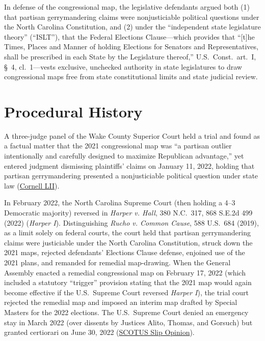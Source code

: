 \documentclass[12pt]{article}
\begin{document}
In defense of the congressional map, the legislative defendants argued both (1) that partisan gerrymandering claims were nonjusticiable political questions under the North Carolina Constitution, and (2) under the ``independent state legislature theory'' (``ISLT''), that the Federal Elections Clause---which provides that ``[t]he Times, Places and Manner of holding Elections for Senators and Representatives, shall be prescribed in each State by the Legislature thereof,'' U.S.\ Const.\ art.\ I, \S~4, cl.\ 1---vests exclusive, unchecked authority in state legislatures to draw congressional maps free from state constitutional limits and state judicial review.

\section{Procedural History}
A three-judge panel of the Wake County Superior Court held a trial and found as a factual matter that the 2021 congressional map was ``a partisan outlier intentionally and carefully designed to maximize Republican advantage,'' yet entered judgment dismissing plaintiffs' claims on January 11, 2022, holding that partisan gerrymandering presented a nonjusticiable political question under state law (\href{https://www.law.cornell.edu/supremecourt/text/21-1271}{Cornell LII}).

In February 2022, the North Carolina Supreme Court (then holding a 4--3 Democratic majority) reversed in \textit{Harper v. Hall}, 380 N.C.\ 317, 868 S.E.2d 499 (2022) (\textit{Harper I}). Distinguishing \textit{Rucho v. Common Cause}, 588 U.S.\ 684 (2019), as a limit solely on federal courts, the court held that partisan gerrymandering claims were justiciable under the North Carolina Constitution, struck down the 2021 maps, rejected defendants' Elections Clause defense, enjoined use of the 2021 plans, and remanded for remedial map-drawing. When the General Assembly enacted a remedial congressional map on February 17, 2022 (which included a statutory ``trigger'' provision stating that the 2021 map would again become effective if the U.S.\ Supreme Court reversed \textit{Harper I}), the trial court rejected the remedial map and imposed an interim map drafted by Special Masters for the 2022 elections. The U.S.\ Supreme Court denied an emergency stay in March 2022 (over dissents by Justices Alito, Thomas, and Gorsuch) but granted certiorari on June 30, 2022 (\href{https://www.supremecourt.gov/opinions/22pdf/21-1271_3f14.pdf}{SCOTUS Slip Opinion}).
\end{document}
